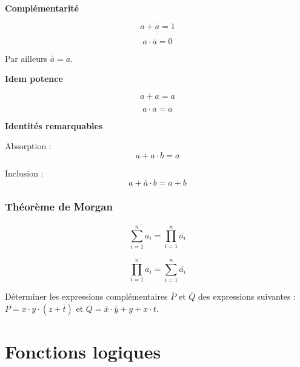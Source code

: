 \documentclass[11pt,oneside]{article}
\begin{document}
\begin{prop}
\textbf{Complémentarité}

\begin{minipage}[c]{.45\linewidth}
$$ a + \overline{a} = 1$$
\end{minipage}\hfill
\begin{minipage}[c]{.45\linewidth}
$$ a\cdot \overline{a} = 0$$
\end{minipage}

Par ailleurs $\overline{\overline{a}}=a$.
\end{prop}



\begin{prop}
\textbf{Idem potence}

\begin{minipage}[c]{.45\linewidth}
$$ a + a = a$$
\end{minipage}\hfill
\begin{minipage}[c]{.45\linewidth}
$$ a\cdot a = a$$
\end{minipage}
\end{prop}


\begin{prop}
\textbf{Identités remarquables}

Absorption : 
$$ a + a\cdot b = a$$

Inclusion :
$$
a+\overline{a}\cdot b = a+b
$$
\end{prop}

\subsubsection{Théorème de Morgan}
\begin{theo}
$$
\overline{\sum\limits_{i=1}^{n} a_i} = \prod\limits_{i=1}^n \overline{a_i}
$$

$$
\overline{\prod\limits_{i=1}^{n} a_i} = \sum\limits_{i=1}^n \overline{a_i}
$$
\end{theo}

\begin{exemple}
Déterminer les expressions complémentaires $\overline{P}$ et $\overline{Q}$ des expressions suivantes : 
$P = x\cdot y \cdot (z + \overline{t})$ et $Q=\overline{x}\cdot\overline{y} + y + x\cdot t$.
\end{exemple}

\section{Fonctions logiques}
\end{document}
